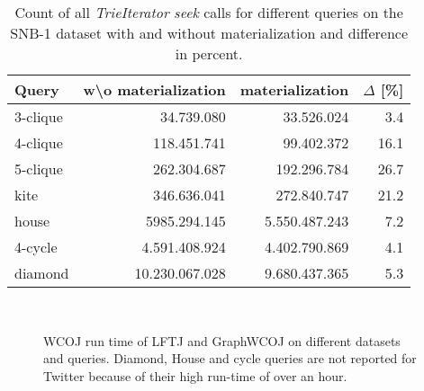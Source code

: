 \begin{table}
    \centering
    \begin{tabular}{lrrr}
        \toprule
        Query       & w\textbackslash o materialization & materialization  &   $\Delta$   [\%]  \\ \midrule
        3-clique    &        34.739.080                    &     33.526.024      &    3.4       \\
        4-clique    &       118.451.741                    &     99.402.372      &   16.1       \\
        5-clique    &       262.304.687                    &    192.296.784      &   26.7       \\
        kite        &       346.636.041                    &    272.840.747      &   21.2       \\
        house       &      5985.294.145                    &  5.550.487.243      &    7.2       \\
        4-cycle     &     4.591.408.924                    &  4.402.790.869      &    4.1       \\
        diamond     &    10.230.067.028                    &  9.680.437.365      &    5.3       \\
        \bottomrule
    \end{tabular}
    \caption{Count of all \textit{TrieIterator} \textit{seek} calls for different queries on the SNB-1 dataset with and
    without materialization and difference in percent.}
    \label{table:seek-calls}
\end{table}

\begin{figure}
    \subfloat[Amazon-0302]{}
    \subfloat[Amazon-0601]{
    
    
    }\\
    \subfloat[SNB-1]{
    
    
    }
    \subfloat[Twitter]{
    
    }
    \caption{
    \textsc{WCOJ} run time of \textsc{LFTJ} and GraphWCOJ on different datasets and queries.
    Diamond, House and cycle queries are not reported for Twitter because of their high
    run-time of over an hour.
    }
    \label{fig:lftj-graphWCOJ}
\end{figure}

